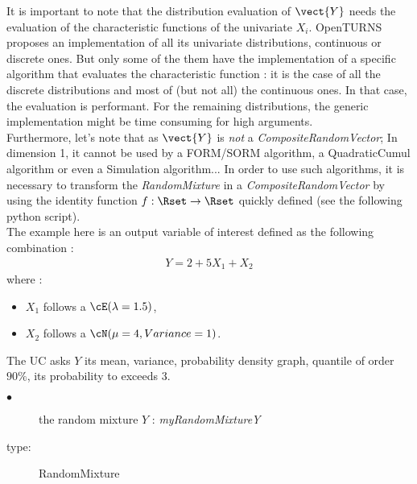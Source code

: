 It is important to note that the distribution evaluation of $\vect{Y}$ needs the evaluation of the characteristic functions of the univariate $X_i$. OpenTURNS proposes an implementation of all its univariate distributions, continuous or discrete ones. But only some of the them have the implementation of a specific algorithm that evaluates the characteristic function : it is the case of all the discrete distributions and most of (but not all) the continuous ones. In that case, the evaluation is performant. For the remaining distributions, the generic implementation might be time consuming for high arguments. \\

Furthermore, let's note that as $\vect{Y}$ is \emph{not} a {\itshape CompositeRandomVector}; In dimension 1, it cannot be used by a FORM/SORM algorithm, a QuadraticCumul algorithm or even a Simulation algorithm... In order to use such algorithms, it is necessary to transform the {\itshape RandomMixture} in a {\itshape CompositeRandomVector} by using the identity function $f : \Rset \rightarrow \Rset$ quickly defined (see the following python script).\\

The example here is an output variable of interest defined as the following combination :
\begin{align*}
  Y = 2 + 5X_1 + X_2
\end{align*}
where :
\begin{itemize}
\item  $X_1$ follows a $\cE(\lambda = 1.5)$,
\item  $X_2$ follows a $\cN(\mu = 4,Variance = 1)$.
\end{itemize}

The UC asks $Y$ its mean, variance, probability density graph, quantile of order $90\%$, its probability to exceeds 3.



\noindent%
             {
               \begin{description}
               \item[$\bullet$] the random mixture $Y$ : {\itshape myRandomMixtureY}
               \item[type:] RandomMixture
               \end{description}
             }

